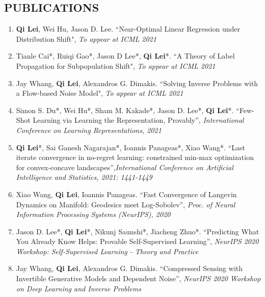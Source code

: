 \documentclass[margin, 10pt]{res} %
\begin{document}
\begin{resume}

\section{PUBLICATIONS}
\begin{enumerate}
\item{ \textbf{Qi Lei}, Wei Hu, Jason D. Lee.	
``Near-Optimal Linear Regression under Distribution Shift", \textit{To appear at ICML 2021}
}	
\item{Tianle Cai*, Ruiqi Gao*, Jason D Lee*, \textbf{Qi Lei}*.  ``A Theory of Label Propagation for Subpopulation Shift", \textit{To appear at ICML 2021} }
\item{Jay Whang, \textbf{Qi Lei}, Alexandros G. Dimakis. ``Solving Inverse Problems with a Flow-based Noise Model", \textit{To appear at ICML 2021}}
	\item{Simon S. Du*, Wei Hu*, Sham M. Kakade*, Jason D. Lee*, \textbf{Qi Lei}*. ``Few-Shot Learning via Learning the Representation, Provably'', \textit{International Conference on Learning Representations, 2021} }
	\item{\textbf{Qi Lei}*, Sai Ganesh Nagarajan*, Ioannis Panageas*, Xiao Wang*. ``Last iterate convergence in no-regret learning: constrained min-max optimization for convex-concave landscapes'',\textit{International Conference on
			Artificial Intelligence and Statistics, 2021: 1441-1449}}
	\item{ Xiao Wang, \textbf{Qi Lei}, Ioannis Panageas. ``Fast Convergence of Langevin Dynamics on Manifold: Geodesics meet Log-Sobolev'', \textit{Proc. of Neural Information Processing Systems (NeurIPS), 2020 }  }
\item{Jason D. Lee*, \textbf{Qi Lei}*, Nikunj Saunshi*, Jiacheng Zhuo*. ``Predicting What You Already Know Helps: Provable Self-Supervised Learning'', \textit{NeurIPS 2020 Workshop: Self-Supervised Learning - Theory and Practice} }
\item{Jay Whang, \textbf{Qi Lei}, Alexandros G. Dimakis. ``Compressed Sensing with Invertible Generative Models and Dependent Noise'', \textit{NeurIPS 2020 Workshop on Deep Learning and Inverse Problems}} 	

\end{enumerate}
\end{resume}
\end{document}
